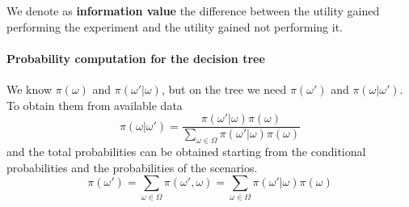 We denote as \textbf{information value} the difference between the utility gained performing the experiment and the utility gained not performing it.

\paragraph{Probability computation for the decision tree} We know $\pi (\omega)$ and $\pi (\omega' | \omega)$, but on the tree we need $\pi (\omega')$ and $\pi (\omega | \omega')$. To obtain them from available data
$$ \pi(\omega | \omega') = \frac{\pi (\omega' | \omega) \pi (\omega)}{\sum_{\omega \in \Omega} \pi (\omega' | \omega) \pi (\omega)}$$
and the total probabilities can be obtained starting from the conditional probabilities and the probabilities of the scenarios. 
$$ \pi (\omega') = \sum_{\omega \in \Omega} \pi (\omega', \omega) = \sum_{\omega \in \Omega} \pi (\omega' | \omega) \pi (\omega) $$